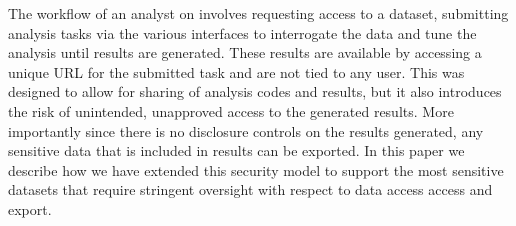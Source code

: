 The workflow of an analyst on \NAME involves requesting access to a dataset, submitting analysis
tasks via the various interfaces to interrogate the data and tune the analysis until results are generated.
These results are available by accessing a unique URL for the submitted task and are not tied to any user.
This was designed to allow for sharing of analysis codes and results, but it also introduces the risk
of unintended, unapproved access to the generated results. More importantly since there is no disclosure
controls on the results generated, any sensitive data that is included in results can be exported.
In this paper we describe how we have extended this security model to support the most sensitive datasets
that require stringent oversight with respect to data access access and export.


